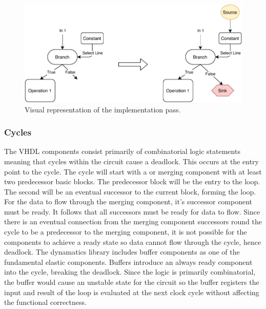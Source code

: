 \begin{figure}[htb!]
    \centering
    \includegraphics[width=\textwidth]{Images/sink_pass.pdf}
    \caption{Visual representation of the  implementation pass.}
    \label{fig:sink_pass}
\end{figure}

\subsubsection{Cycles}
The VHDL components consist primarily of combinatorial logic statements meaning that cycles within the circuit cause a deadlock. This occurs at the entry point to the cycle. The cycle will start with a  or merging component with at least two predecessor basic blocks. The predecessor block will be the entry to the loop. The second will be an eventual successor to the current block, forming the loop. For the data to flow through the merging component, it's successor component must be ready. It follows that all successors must be ready for data to flow. Since there is an eventual connection from the merging component successors round the cycle to be a predecessor to the merging component, it is not possible for the components to achieve a ready state so data cannot flow through the cycle, hence deadlock. The dynamatics library includes buffer components as one of the fundamental elastic components. Buffers introduce an always ready component into the cycle, breaking the deadlock. Since the logic is primarily combinatorial, the buffer would cause an unstable state for the circuit so the buffer registers the input and result of the loop is evaluated at the next clock cycle without affecting the functional correctness.

